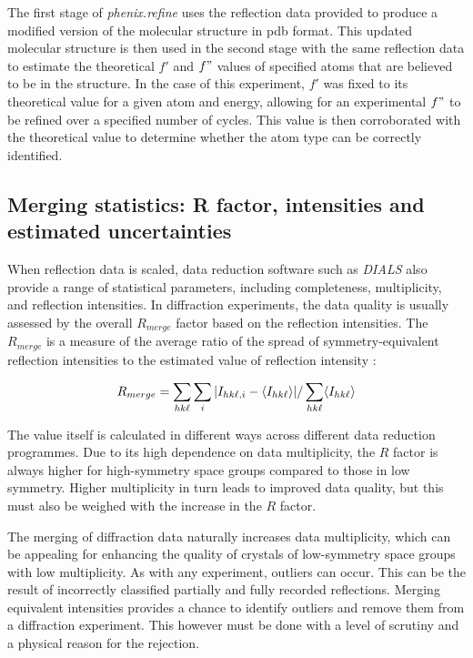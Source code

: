 The first stage of \textit{phenix.refine} uses the reflection data provided to produce a modified version of the molecular structure in \ac{pdb} format. This updated molecular structure is then used in the second stage with the same reflection data to estimate the theoretical $f'$ and $f"$ values of specified atoms that are believed to be in the structure. In the case of this experiment, $f'$ was fixed to its theoretical value for a given atom and energy, allowing for an experimental $f"$ to be refined over a specified number of cycles. This value is then corroborated with the theoretical value to determine whether the atom type can be correctly identified.%

\subsection{Merging statistics: R factor, intensities and estimated uncertainties}

When reflection data is scaled, data reduction software such as \textit{DIALS} also provide a range of statistical parameters, including completeness, multiplicity, and reflection intensities. In diffraction experiments, the data quality is usually assessed by the overall $R_{merge}$ factor based on the reflection intensities. The $R_{merge}$ is a measure of the average ratio of the spread of symmetry-equivalent reflection intensities to the estimated value of reflection intensity \cite{Dauter1999}:

\begin{equation}
    R_{merge} = \sum_{hk\ell}\sum_i | I_{hk\ell,i} - \langle I_{hk\ell} \rangle | / \sum_{hk\ell} \langle I_{hk\ell} \rangle
\end{equation}

The value itself is calculated in different ways across different data reduction programmes. Due to its high dependence on data multiplicity, the $R$ factor is always higher for high-symmetry space groups compared to those in low symmetry. Higher multiplicity in turn leads to improved data quality, but this must also be weighed with the increase in the $R$ factor.

The merging of diffraction data naturally increases data multiplicity, which can be appealing for enhancing the quality of crystals of low-symmetry space groups with low multiplicity. As with any experiment, outliers can occur. This can be the result of incorrectly classified partially and fully recorded reflections. Merging equivalent intensities provides a chance to identify outliers and remove them from a diffraction experiment. This however must be done with a level of scrutiny and a physical reason for the rejection.

